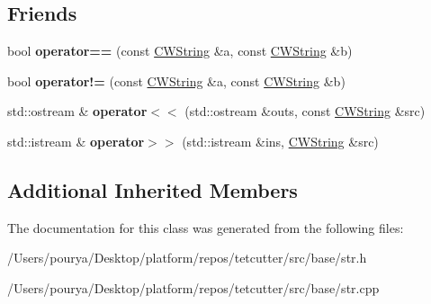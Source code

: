 \subsection*{Friends}
\begin{DoxyCompactItemize}
\item 
\hypertarget{classps_1_1base_1_1CWString_a088804404b2bd2cc784eb7efab6e8352}{}bool {\bfseries operator==} (const \hyperlink{classps_1_1base_1_1CWString}{C\+W\+String} \&a, const \hyperlink{classps_1_1base_1_1CWString}{C\+W\+String} \&b)\label{classps_1_1base_1_1CWString_a088804404b2bd2cc784eb7efab6e8352}

\item 
\hypertarget{classps_1_1base_1_1CWString_a4b138b6163fa871754420174beaceafe}{}bool {\bfseries operator!=} (const \hyperlink{classps_1_1base_1_1CWString}{C\+W\+String} \&a, const \hyperlink{classps_1_1base_1_1CWString}{C\+W\+String} \&b)\label{classps_1_1base_1_1CWString_a4b138b6163fa871754420174beaceafe}

\item 
\hypertarget{classps_1_1base_1_1CWString_a6270ea1b8ae876bceffcece540cfc43a}{}std\+::ostream \& {\bfseries operator$<$$<$} (std\+::ostream \&outs, const \hyperlink{classps_1_1base_1_1CWString}{C\+W\+String} \&src)\label{classps_1_1base_1_1CWString_a6270ea1b8ae876bceffcece540cfc43a}

\item 
\hypertarget{classps_1_1base_1_1CWString_acabf840c60b48242da8d70df900f393d}{}std\+::istream \& {\bfseries operator$>$$>$} (std\+::istream \&ins, \hyperlink{classps_1_1base_1_1CWString}{C\+W\+String} \&src)\label{classps_1_1base_1_1CWString_acabf840c60b48242da8d70df900f393d}

\end{DoxyCompactItemize}
\subsection*{Additional Inherited Members}


The documentation for this class was generated from the following files\+:\begin{DoxyCompactItemize}
\item 
/\+Users/pourya/\+Desktop/platform/repos/tetcutter/src/base/str.\+h\item 
/\+Users/pourya/\+Desktop/platform/repos/tetcutter/src/base/str.\+cpp\end{DoxyCompactItemize}
